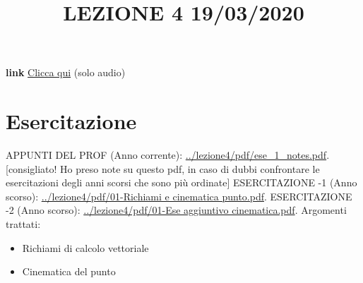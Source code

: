 \title{LEZIONE 4 19/03/2020}\newline
\textbf{link} \href{https://web.microsoftstream.com/video/4f8d8d0e-8354-4151-bbc2-efa8e7399119?list=user&userId=c487c446-28dc-44c3-b1fb-2fe7e71e0737}{Clicca qui} (solo audio)
\section*{Esercitazione}
APPUNTI DEL PROF (Anno corrente): \url{../lezione4/pdf/ese_1_notes.pdf}. [consigliato! Ho preso note su questo pdf, in caso di dubbi confrontare le esercitazioni degli anni scorsi che sono più ordinate]\newline
\newline
ESERCITAZIONE -1 (Anno scorso): \url{../lezione4/pdf/01-Richiami e cinematica punto.pdf}.\newline
\newline
ESERCITAZIONE -2 (Anno scorso): \url{../lezione4/pdf/01-Ese aggiuntivo cinematica.pdf}.\newline
\newline
Argomenti trattati:
\begin{itemize}
    \item Richiami di calcolo vettoriale
    \item Cinematica del punto
\end{itemize}